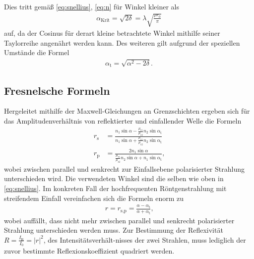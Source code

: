 \documentclass[12pt]{article}
\begin{document}
Dies tritt gemäß \autoref{eq:snellius}, \ref{eq:n} für Winkel kleiner als
\begin{align}
  \alpha_\text{Krit} = \sqrt{2 \delta} = \lambda \sqrt{\frac{\rho r_0}{\pi}}
\end{align}
auf, da der Cosinus für derart kleine betrachtete Winkel mithilfe seiner Taylorreihe angenährt werden kann.
Des weiteren gilt aufgrund der speziellen Umstände die Formel
\begin{align}
  \alpha_\text{t} = \sqrt{\alpha^2-2\delta}\text{.}
\end{align}
\subsection{Fresnelsche Formeln}
Hergeleitet mithilfe der Maxwell-Gleichungen an Grenzschichten ergeben sich für das Amplitudenverhältnis von reflektierter und einfallender Welle die Formeln
\begin{align}
  r_\text{s} &= \frac{n_1\sin{\alpha}-\frac{\mu_\text{r1}}{\mu_\text{r2}}n_2\sin{\alpha_\text{t}}}{n_1\sin{\alpha}+\frac{\mu_\text{r1}}{\mu_\text{r2}}n_2\sin{\alpha_\text{t}}}\\
  r_\text{p} &= \frac{2n_1\sin{\alpha}}{\frac{\mu_\text{r1}}{\mu_\text{r2}}n_2\sin{\alpha}+n_1\sin{\alpha_\text{t}}}\text{,}
\end{align}
wobei zwischen parallel und senkrecht zur Einfallsebene polarisierter Strahlung unterschieden wird. Die verwendeten Winkel sind die selben wie oben in \autoref{eq:snellius}.
Im konkreten Fall der hochfrequenten Röntgenstrahlung mit streifendem Einfall vereinfachen sich die Formeln enorm zu
\begin{align}
  r = r_\text{s,p} = \frac{\alpha-\alpha_\text{t}}{\alpha+\alpha_\text{t}}\text{,}
\end{align}
wobei auffällt, dass nicht mehr zwischen parallel und senkrecht polarisierter Strahlung unterschieden werden muss.
Zur Bestimmung der Reflexivität $R=\frac{I_\text{R}}{I_0}=|r|^2$, des Intensitätsverhält-nisses der zwei Strahlen, muss lediglich der zuvor bestimmte Reflexionskoeffizient quadriert werden.
\end{document}
